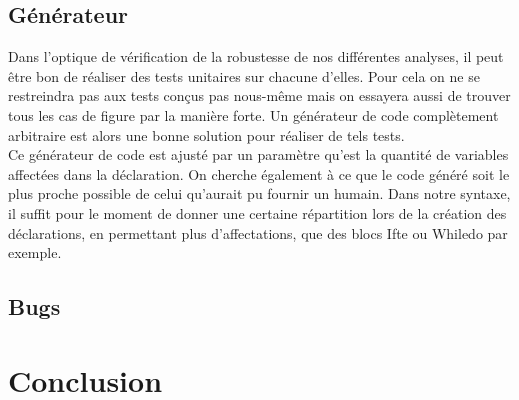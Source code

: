 \documentclass[a4paper, 11pt]{article}
\begin{document}
\subsection{Générateur}
Dans l'optique de vérification de la robustesse de nos différentes analyses, il peut être bon de réaliser
des tests unitaires sur chacune d'elles. Pour cela on ne se restreindra pas aux tests conçus pas nous-même
mais on essayera aussi de trouver tous les cas de figure par la manière forte. Un générateur de code complètement
arbitraire est alors une bonne solution pour réaliser de tels tests.
\\
Ce générateur de code est ajusté par un paramètre qu'est la quantité de variables affectées dans la déclaration. On
cherche également à ce que le code généré soit le plus proche possible de celui qu'aurait pu fournir un humain.
Dans notre syntaxe, il suffit pour le moment de donner une certaine répartition lors de la création des déclarations,
en permettant plus d'affectations, que des blocs Ifte ou Whiledo par exemple.
\subsection{Bugs}
\section{Conclusion}
\end{document}

